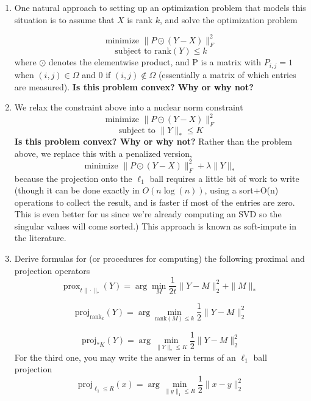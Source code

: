 \documentclass[11pt]{amsart}
\begin{document}
\begin{enumerate}
\begin{enumerate}

\item One natural approach to setting up an optimization problem that models this situation is to assume that $X$ is rank $k$, and solve the optimization problem 

\begin{equation}
\textrm{minimize  } \| P\odot(Y-X)\|_F^2
\end{equation}
\[
\textrm{subject to  } \textrm{rank}(Y)\leq k
\]
where $\odot$ denotes the elementwise product, and P is a matrix with $P_{i,j}=1$ when $(i,j)\in\Omega$ and 0 if $(i,j)\not\in\Omega$ (essentially a matrix of which entries are measured). \textbf{Is this problem convex? Why or why not?}

\item We relax the constraint above into a nuclear norm constraint
\[
\textrm{minimize  } \| P\odot(Y-X)\|_F^2
\]
\[
\textrm{subject to  } \|Y\|_*\leq K
\]
\textbf{Is this problem convex? Why or why not?} Rather than the problem above, we replace this with a penalized version,
\begin{equation}
\textrm{minimize  } \| P\odot(Y-X)\|_F^2 + \lambda \|Y\|_*
\end{equation}
because the projection onto the $\ell_1$ ball requires a little bit of work to write (though it can be done exactly in $O(n\log(n))$, using a sort+O(n) operations to collect the result, and is faster if most of the entries are zero. This is even better for us since we're already computing an SVD so the singular values will come sorted.) This approach is known as soft-impute in the literature.



\item Derive formulas for (or procedures for computing) the following proximal and projection operators
\[
\textrm{prox}_{t\|\cdot\|_*}(Y)=\arg \min_M \frac{1}{2t}\|Y-M\|_2^2 + \|M\|_*
\]

\[
\textrm{proj}_{\textrm{rank}_k}(Y)=\arg \min_{\textrm{rank}(M)\leq k} \frac{1}{2}\|Y-M\|_2^2
\]

\[
\textrm{proj}_{*K}(Y)=\arg \min_{\|Y\|_*\leq K} \frac{1}{2}\|Y-M\|_2^2
\]
For the third one, you may write the answer in terms of an $\ell_1$ ball projection
\[
\textrm{proj}_{\ell_1\leq R}(x)=\arg\min_{\|y\|_1\leq R} \frac{1}{2}\|x-y\|_2^2
\]



\end{enumerate}
\end{enumerate}
\end{document}
